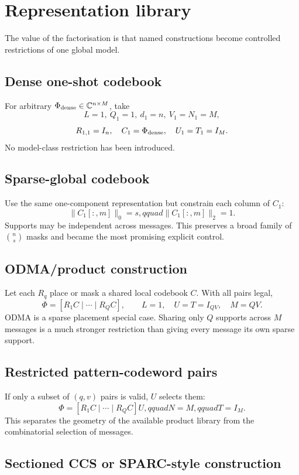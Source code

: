 \documentclass[11pt]{article}
\begin{document}
\section{Representation library}

The value of the factorisation is that named constructions become controlled restrictions of one global model.

\subsection{Dense one-shot codebook}

For arbitrary $\Phi_{\rm dense}\in\mathbb{C}^{n\times M}$, take
\[
 L=1,\ Q_1=1,\ d_1=n,\ V_1=N_1=M,
\]
\[
 R_{1,1}=I_n,\quad C_1=\Phi_{\rm dense},\quad U_1=T_1=I_M.
\]
No model-class restriction has been introduced.

\subsection{Sparse-global codebook}

Use the same one-component representation but constrain each column of $C_1$:
\[
 \|C_1[:,m]\|_0=s,qquad \|C_1[:,m]\|_2=1.
\]
Supports may be independent across messages. This preserves a broad family of $\binom ns$ masks and became the most
promising explicit control.

\subsection{ODMA/product construction}

Let each $R_q$ place or mask a shared local codebook $C$. With all pairs legal,
\[
 \Phi=[R_1C\mid\cdots\mid R_QC],\qquad L=1,\quad U=T=I_{QV},\quad M=QV.
\]
ODMA is a sparse placement special case. Sharing only $Q$ supports across $M$ messages is a much stronger restriction
than giving every message its own sparse support.

\subsection{Restricted pattern-codeword pairs}

If only a subset of $(q,v)$ pairs is valid, $U$ selects them:
\[
 \Phi=[R_1C\mid\cdots\mid R_QC]U,qquad N=M,qquad T=I_M.
\]
This separates the geometry of the available product library from the combinatorial selection of messages.

\subsection{Sectioned CCS or SPARC-style construction}
\end{document}

